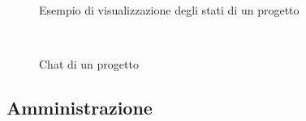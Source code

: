 \documentclass{article}
\begin{document}
\begin{figure}[!h]
    \begin{minipage}[c]{0.5\linewidth}
        \centering
        \\
        \caption{Esempio di visualizzazione degli stati di un progetto}
    \end{minipage}\hfill
    \begin{minipage}[c]{0.5\linewidth}
        \centering
        \\
        \caption{Chat di un progetto}
    \end{minipage}
\end{figure}


\subsection{Amministrazione}
\end{document}
